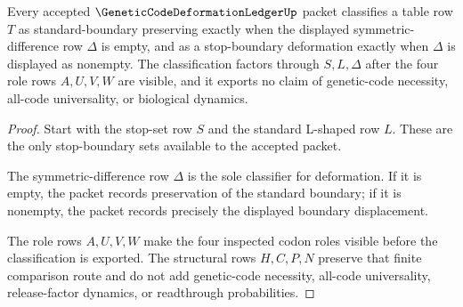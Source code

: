 \begin{theorem}
\label{thm:genetic-code-deformation-ledger-boundary-classification}
Every accepted $\GeneticCodeDeformationLedgerUp$ packet classifies a table row $T$ as standard-boundary preserving exactly when the displayed symmetric-difference row $\Delta$ is empty, and as a stop-boundary deformation exactly when $\Delta$ is displayed as nonempty. The classification factors through $S,L,\Delta$ after the four role rows $A,U,V,W$ are visible, and it exports no claim of genetic-code necessity, all-code universality, or biological dynamics.
\end{theorem}
\begin{proof}
Start with the stop-set row $S$ and the standard L-shaped row $L$. These are the only stop-boundary sets available to the accepted packet.

The symmetric-difference row $\Delta$ is the sole classifier for deformation. If it is empty, the packet records preservation of the standard boundary; if it is nonempty, the packet records precisely the displayed boundary displacement.

The role rows $A,U,V,W$ make the four inspected codon roles visible before the classification is exported. The structural rows $H,C,P,N$ preserve that finite comparison route and do not add genetic-code necessity, all-code universality, release-factor dynamics, or readthrough probabilities.
\end{proof}



